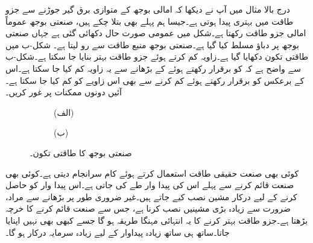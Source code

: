 درج بالا مثال میں آپ نے دیکھا کہ امالی بوجھ کے متوازی برق گیر جوڑنے سے جزو طاقت میں بہتری پیدا ہوتی ہے۔جیسا ہم پہلے بھی بتلا چکے ہیں، صنعتی بوجھ عموماً امالی جزو طاقت رکھتا ہے۔شکل  میں عمومی صورت حال دکھائی گئی ہے جہاں صنعتی بوجھ پر  دباؤ مسلط کیا گیا ہے۔صنعتی بوجھ منبع طاقت سے  رو لیتا ہے۔ شکل-ب میں طاقتی تکون دکھایا گیا ہے۔زاویہ  کم کرتے ہوئے جزو طاقت بہتر بنایا جا سکتا ہے۔شکل-ب سے واضح ہے کہ  کو برقرار رکھتے ہوئے  کے بڑھانے سے یہ زاویہ کم کیا جا سکتا ہے۔اس کے برعکس  کو برقرار رکھتے ہوئے  کم کرنے   سے بھی اس زاویے کو کم  کیا جا سکتا ہے۔آئیں دونوں ممکنات پر غور کریں۔
\begin{figure}
\centering
\begin{subfigure}{0.5\textwidth}
\centering
{}
\caption*{(الف)}
\end{subfigure}%
\begin{subfigure}{0.5\textwidth}
\centering
{}
\caption*{(ب)}
\end{subfigure}%
\caption{صنعتی بوجھ کا طاقتی تکون۔}
\label{شکل_طاقت_درستگی_جزو_طاقت_صنعتی}
\end{figure}

کوئی بھی صنعت حقیقی طاقت  استعمال کرتے ہوئے کام سرانجام دیتی ہے۔کوئی بھی صنعت قائم کرنے سے پہلے اس کی پیدا وار طے کی جاتی ہے۔اس پیدا وار کو حاصل کرنے کے لیے درکار مشین نصب کیے جاتے ہیں۔غیر ضروری طور پر  بڑھانے سے مراد، ضرورت سے زیادہ بڑی مشینیں نصب کرنا ہے، جس سے صنعت قائم کرنے کا خرچہ بڑھتا ہے۔جزو طاقت بہتر کرنے کا یہ انتہائی مہنگا طریقہ ہو گا جسے کبھی بھی نہیں اپنایا جاتا۔ساتھ ہی ساتھ زیادہ پیداوار کے لیے زیادہ سرمایہ درکار ہو گا۔

